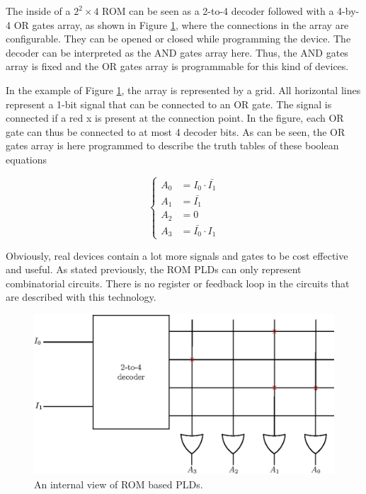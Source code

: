 The inside of a $2^2 \times 4$ ROM can be seen as a 2-to-4 decoder followed with a 4-by-4 OR gates 
array, as shown in Figure \ref{fig:fpga/pld_rom_internal}, where the connections in the array are configurable. They can be opened or closed while
programming the device. The decoder can be interpreted as the AND gates array here. Thus, the
AND gates array is fixed and the OR gates array is programmable for this kind of devices.

In the example of Figure \ref{fig:fpga/pld_rom_internal}, the array is represented by a grid. All horizontal lines represent a 1-bit signal
that can be connected to an OR gate. The signal is connected if a red x is present at the connection
point. In the figure, each OR gate can thus be connected to at most 4 decoder bits. As can be seen, 
the OR gates array is here programmed to describe the truth tables of these 
boolean equations

\begin{equation*}
    \begin{cases}
        A_0& = I_0 \cdot \bar{I_1} \\
        A_1& = \bar{I_1} \\
        A_2& = 0 \\
        A_3& = \bar{I_0} \cdot I_1
    \end{cases}
\end{equation*}


Obviously, real devices contain a lot more signals and gates to be cost effective and useful. 
As stated previously, the ROM PLDs can only represent combinatorial circuits. There is no register
or feedback loop in the circuits that are described with this technology.

\begin{figure}[H]
    \centering
    \includegraphics[scale=0.8]{Chapter1-Hardware/res/pld_rom_internal}
    \caption{An internal view of ROM based PLDs.}
    \label{fig:fpga/pld_rom_internal}
\end{figure}

